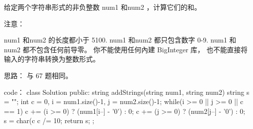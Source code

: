 给定两个字符串形式的非负整数 num1 和num2 ，计算它们的和。

注意：

    num1 和num2 的长度都小于 5100.
    num1 和num2 都只包含数字 0-9.
    num1 和num2 都不包含任何前导零。
    你不能使用任何內建 BigInteger 库， 也不能直接将输入的字符串转换为整数形式。


























思路：
与 67 题相同。

























code：
class Solution {
public:
    string addStrings(string num1, string num2) {
        string s = "";
        int c = 0, i = num1.size()-1, j = num2.size()-1;
        while(i >= 0 || j >= 0 || c == 1)
        {
            c += (i >= 0) ? (num1[i--] - '0') : 0;
            c += (j >= 0) ? (num2[j--] - '0') : 0;
            s = char(c%
            c /= 10;
        }
        return s;
    }
};